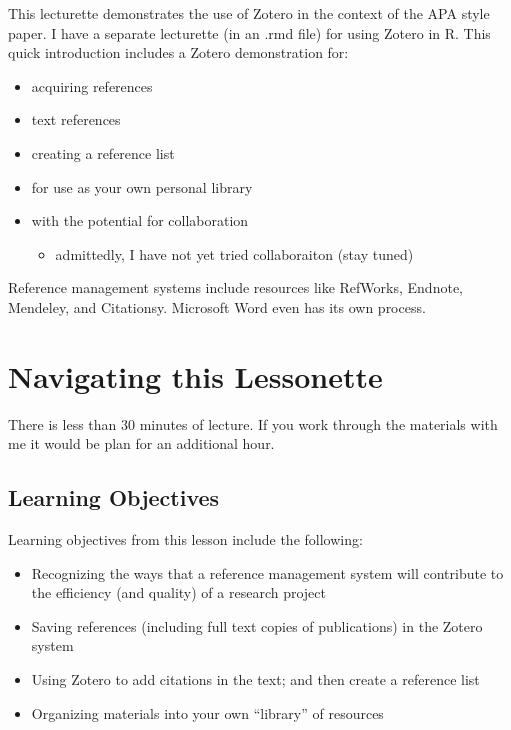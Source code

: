 \documentclass[
  english,
]{book}
\providecommand{\tightlist}{%
  \setlength{\itemsep}{0pt}\setlength{\parskip}{0pt}}
\begin{document}
This lecturette demonstrates the use of Zotero in the context of the APA style paper. I have a separate lecturette (in an .rmd file) for using Zotero in R. This quick introduction includes a Zotero demonstration for:

\begin{itemize}
\tightlist
\item
  acquiring references
\item
  text references
\item
  creating a reference list
\item
  for use as your own personal library
\item
  with the potential for collaboration

  \begin{itemize}
  \tightlist
  \item
    admittedly, I have not yet tried collaboraiton (stay tuned)
  \end{itemize}
\end{itemize}

Reference management systems include resources like RefWorks, Endnote, Mendeley, and Citationsy. Microsoft Word even has its own process.

\hypertarget{navigating-this-lessonette}{%
\section{Navigating this Lessonette}\label{navigating-this-lessonette}}

There is less than 30 minutes of lecture. If you work through the materials with me it would be plan for an additional hour.

\hypertarget{learning-objectives-1}{%
\subsection{Learning Objectives}\label{learning-objectives-1}}

Learning objectives from this lesson include the following:

\begin{itemize}
\tightlist
\item
  Recognizing the ways that a reference management system will contribute to the efficiency (and quality) of a research project
\item
  Saving references (including full text copies of publications) in the Zotero system
\item
  Using Zotero to add citations in the text; and then create a reference list
\item
  Organizing materials into your own ``library'' of resources
\end{itemize}
\end{document}
